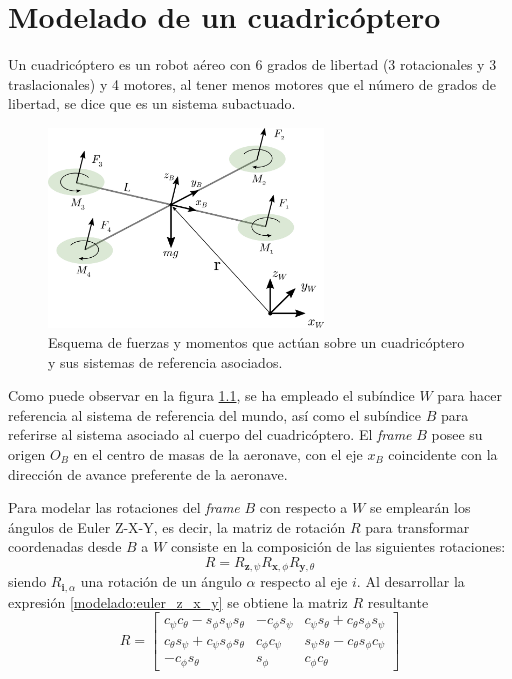 \chapter{Modelado de un cuadricóptero}

Un cuadricóptero es un robot aéreo con 6 grados de libertad (3 rotacionales y 3 traslacionales) y 4 motores, al tener menos motores que el número de grados de libertad, se dice que es un sistema subactuado.

\begin{figure}[htb!]
	\centering
	\includegraphics[width=0.65\textwidth]{imagenes/uav_coordinate_system}
	\caption{Esquema de fuerzas y momentos que actúan sobre un cuadricóptero y sus sistemas de referencia asociados. }
	\label{modelado:uav_coordinate}
\end{figure}

Como puede observar en la figura \ref{modelado:uav_coordinate}, se ha  empleado el subíndice $W$ para hacer referencia al sistema de referencia del mundo, así como el subíndice $B$ para referirse al sistema asociado al cuerpo del cuadricóptero. El \textit{frame} $B$ posee su origen $O_B$ en el centro de masas de la aeronave, con el eje $x_B$ coincidente con la dirección de avance preferente de la aeronave.

Para modelar las rotaciones del \textit{frame} $B$ con respecto a $W$ se emplearán los ángulos de Euler Z-X-Y, es decir, la matriz de rotación $R$ para transformar coordenadas desde $B$ a $W$ consiste en la composición de las siguientes rotaciones:
\begin{equation}
	R = R_{\mathbf{z},\psi}R_{\mathbf{x},\phi}R_{\mathbf{y},\theta}
	\label{modelado:euler_z_x_y}
\end{equation}
siendo $R_{\mathbf{i},\alpha}$ una rotación de un ángulo $\alpha$ respecto al eje $i$. Al desarrollar la expresión \ref{modelado:euler_z_x_y} se obtiene la matriz $R$ resultante
\begin{equation}
	\label{modelado:R}
	R = \begin{bmatrix}
		c_{\psi} c_{\theta} - s_{\phi} s_{\psi} s_{\theta} &  -c_{\phi} s_{\psi}& c_{\psi} s_{\theta} +  c_{\theta} s_{\phi} s_{\psi}\\
		c_{\theta} s_{\psi} +  c_{\psi} s_{\phi} s_{\theta} & c_{\phi} c_{\psi} & s_{\psi} s_{\theta} -  c_{\theta} s_{\phi} c_{\psi} \\
		-c_{\phi}s_{\theta}& s_{\phi} & c_{\phi}c_{\theta} 
	\end{bmatrix}
\end{equation}

